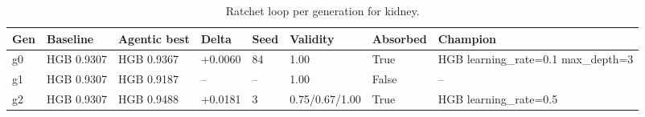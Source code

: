\begin{table}[H]
\centering\small
\caption{Ratchet loop per generation for kidney.}
\label{tab:ratchet-generations-ratchet-ledger-kidney}
\begin{tabular}{llllllll}
\toprule
Gen & Baseline & Agentic best & Delta & Seed & Validity & Absorbed & Champion \\
\midrule
g0 & HGB 0.9307 & HGB 0.9367 & +0.0060 & 84 & 1.00 & True & HGB learning\_rate=0.1 max\_depth=3 \\
g1 & HGB 0.9307 & HGB 0.9187 & -- & -- & 1.00 & False & -- \\
g2 & HGB 0.9307 & HGB 0.9488 & +0.0181 & 3 & 0.75/0.67/1.00 & True & HGB learning\_rate=0.5 \\
\bottomrule
\end{tabular}
\end{table}
